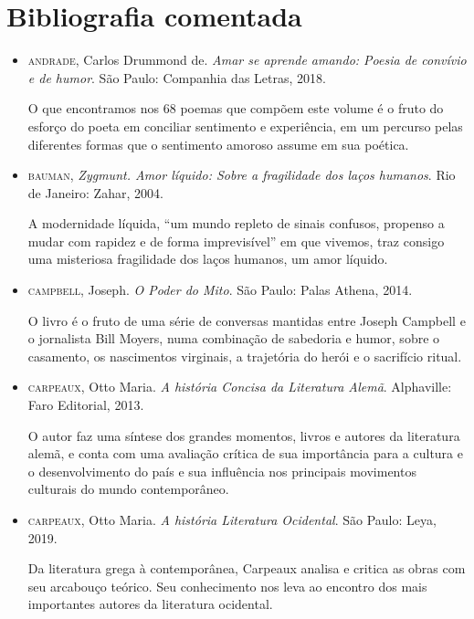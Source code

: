 \documentclass[12pt]{extarticle}
\begin{document}
\section{Bibliografia comentada}

\begin{itemize}

\item\textsc{andrade}, Carlos Drummond de. \textit{Amar se aprende amando: Poesia de
convívio e de humor}. São Paulo: Companhia das Letras, 2018.

O que encontramos nos 68 poemas que compõem este volume é o fruto do
esforço do poeta em conciliar sentimento e experiência, em um percurso
pelas diferentes formas que o sentimento amoroso assume em sua poética.

\item\textsc{bauman,} \textit{Zygmunt. Amor líquido: Sobre a fragilidade dos
laços humanos}. Rio de Janeiro: Zahar, 2004.

A modernidade líquida, ``um mundo repleto de sinais confusos, propenso a
mudar com rapidez e de forma imprevisível'' em que vivemos, traz consigo
uma misteriosa fragilidade dos laços humanos, um amor líquido.

\item\textsc{campbell}, Joseph. \textit{O Poder do Mito}. São Paulo: Palas Athena,
2014.

O livro é o fruto de uma série de conversas mantidas entre Joseph
Campbell e o jornalista Bill Moyers, numa combinação de sabedoria e
humor, sobre o casamento, os nascimentos virginais, a trajetória do
herói e o sacrifício ritual.

\item\textsc{carpeaux}, Otto Maria. \textit{A história Concisa da Literatura Alemã}.
Alphaville: Faro Editorial, 2013.

O autor faz uma síntese dos grandes momentos, livros e autores da
literatura alemã, e conta com uma avaliação crítica de sua importância
para a cultura e o desenvolvimento do país e sua influência nos
principais movimentos culturais do mundo contemporâneo.

\item\textsc{carpeaux}, Otto Maria. \textit{A história Literatura Ocidental}. São
Paulo: Leya, 2019.

Da literatura grega à contemporânea, Carpeaux analisa e critica as obras
com seu arcabouço teórico. Seu conhecimento nos leva ao encontro dos
mais importantes autores da literatura ocidental.


\end{itemize}
\end{document}
